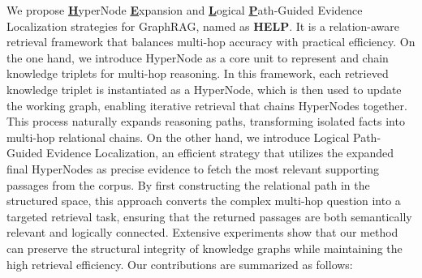 We propose \underline{\textbf{H}}yperNode \underline{\textbf{E}}xpansion and \underline{\textbf{L}}ogical \underline{\textbf{P}}ath-Guided Evidence Localization strategies for GraphRAG, named as \textbf{HELP}. It is a relation-aware retrieval framework that balances multi-hop accuracy with practical efficiency. On the one hand, we introduce HyperNode as a core unit to represent and chain knowledge triplets for multi-hop reasoning. In this framework, each retrieved knowledge triplet is instantiated as a HyperNode, which is then used to update the working graph, enabling iterative retrieval that chains HyperNodes together. This process naturally expands reasoning paths, transforming isolated facts into multi-hop relational chains.
On the other hand, we introduce Logical Path-Guided Evidence Localization, an efficient strategy that utilizes the expanded final HyperNodes as precise evidence to fetch the most relevant supporting passages from the corpus. By first constructing the relational path in the structured space, this approach converts the complex multi-hop question into a targeted retrieval task, ensuring that the returned passages are both semantically relevant and logically connected.
Extensive experiments show that our method can preserve the structural integrity of knowledge graphs while maintaining the high retrieval efficiency. Our contributions are summarized as follows:




